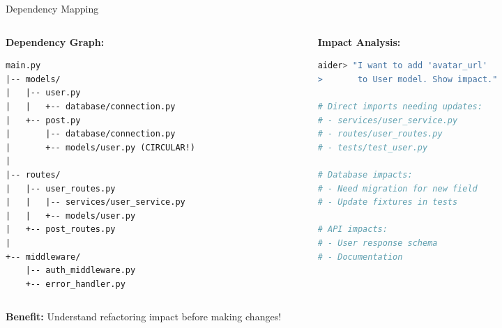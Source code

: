 \documentclass[aspectratio=169,11pt]{beamer}
\begin{document}
\begin{frame}[fragile]{Dependency Mapping}
    \begin{columns}[T]
        \begin{column}{0.48\textwidth}
            \textbf{Dependency Graph:}
            \begin{lstlisting}[basicstyle=\ttfamily\tiny]
main.py
|-- models/
|   |-- user.py
|   |   +-- database/connection.py
|   +-- post.py
|       |-- database/connection.py
|       +-- models/user.py (CIRCULAR!)
|
|-- routes/
|   |-- user_routes.py
|   |   |-- services/user_service.py
|   |   +-- models/user.py
|   +-- post_routes.py
|
+-- middleware/
    |-- auth_middleware.py
    +-- error_handler.py
            \end{lstlisting}
        \end{column}
        \begin{column}{0.48\textwidth}
            \textbf{Impact Analysis:}
            \begin{lstlisting}[language=bash, basicstyle=\ttfamily\tiny]
aider> "I want to add 'avatar_url'
>       to User model. Show impact."

# Direct imports needing updates:
# - services/user_service.py
# - routes/user_routes.py
# - tests/test_user.py

# Database impacts:
# - Need migration for new field
# - Update fixtures in tests

# API impacts:
# - User response schema
# - Documentation
            \end{lstlisting}
        \end{column}
    \end{columns}

    \vspace{0.2cm}
    \textbf{Benefit:} Understand refactoring impact before making changes!

\end{frame}
\end{document}

